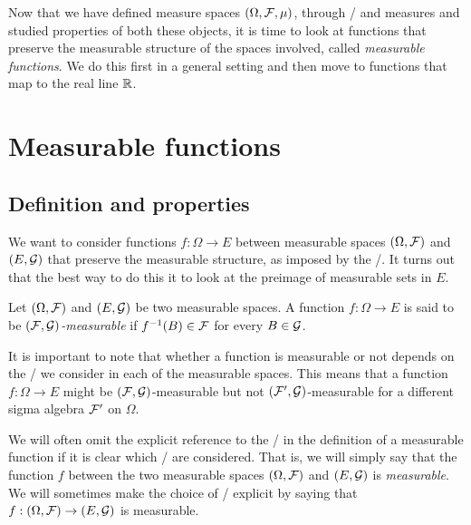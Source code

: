 
Now that we have defined measure spaces $(\Omega, \mathcal F, \mu)$, through \sigalgs/ and measures and studied properties of both these objects, it is time to look at functions that preserve the measurable structure of the spaces involved, called \emph{measurable functions}. We do this first in a general setting and then move to functions that map to the real line $\mathbb R$.


\section{Measurable functions}



\subsection{Definition and properties}

We want to consider functions $f : \Omega \to E$ between measurable spaces $(\Omega, \mathcal F)$ and $(E, \mathcal G)$ that preserve the measurable structure, as imposed by the \sigalgs/. It turns out that the best way to do this it to look at the preimage of measurable sets in $E$.

\begin{definition}\label{def:measurable_function}
Let $(\Omega, \mathcal F)$ and $(E, \mathcal G)$ be two measurable spaces. A function $f: \Omega \to E$ is said to be \emph{$(\mathcal F, \mathcal G)$-measurable} if $f^{-1}(B) \in \mathcal F$ for every $B \in \mathcal G$.
\end{definition}

It is important to note that whether a function is measurable or not depends on the \sigalgs/ we consider in each of the measurable spaces. This means that a function $f : \Omega \to E$ might be $(\mathcal F, \mathcal G)$-measurable but not $(\mathcal F^\prime, \mathcal G)$-measurable for a different sigma algebra $\mathcal F^\prime$ on $\Omega$. 

We will often omit the explicit reference to the \sigalgs/ in the definition of a measurable function if it is clear which \sigalgs/ are considered. That is, we will simply say that the function $f$ between the two measurable spaces $(\Omega, \mathcal F)$ and $(E, \mathcal G)$ is \emph{measurable}. We will sometimes make the choice of \sigalgs/ explicit by saying that $f: (\Omega, \mathcal F) \to (E, \mathcal G)$ is measurable.

